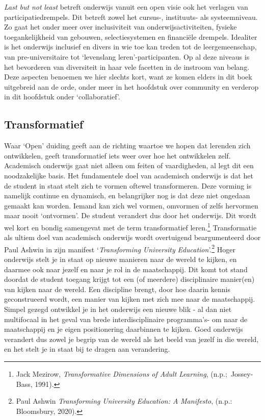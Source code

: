 \documentclass[smallauthor, chapterhaspagenum, nochapterinheader, pagenuminheader,  bigchapnum,medium2, tocpages,  garamond, titleinheader]{jote-book}
\begin{document}
	\emph{Last but }\emph{not}\emph{ }\emph{least}\emph{ }betreft onderwijs vanuit een open visie ook het verlagen van participatiedrempels. Dit betreft zowel het cursus-, instituuts- als systeemniveau. Zo gaat het onder meer over inclusiviteit van onderwijsactiviteiten, fysieke toegankelijkheid van gebouwen, selectiesystemen en financiële drempels. Idealiter is het onderwijs inclusief en divers in wie toe kan treden tot de leergemeenschap, van pre-universitaire tot ‘levenslang leren'-participanten. Op al deze niveaus is het bevorderen van diversiteit in haar vele facetten in de instroom van belang. Deze aspecten benoemen we hier slechts kort, want ze komen elders in dit boek uitgebreid aan de orde, onder meer in het hoofdstuk over community en verderop in dit hoofdstuk onder ‘collaboratief'.



	\subsection{Transformatief}



	Waar ‘Open' duiding geeft aan de richting waartoe we hopen dat lerenden zich ontwikkelen, geeft transformatief iets weer over hoe het ontwikkelen zelf. Academisch onderwijs gaat niet alleen om feiten of vaardigheden, al legt dit een noodzakelijke basis. Het fundamentele doel van academisch onderwijs is dat het de student in staat stelt zich te vormen oftewel transformeren. Deze vorming is namelijk continue en dynamisch, en belangrijker nog is dat deze niet ongedaan gemaakt kan worden. Iemand kan zich wel vormen, omvormen of zelfs hervormen maar nooit ‘ontvormen'. De student verandert dus door het onderwijs. Dit wordt wel kort en bondig samengevat met de term transformatief leren.\footnote{Jack Mezirow, \emph{Transformative}\emph{ }\emph{Dimensions}\emph{ of Adult Lea}\emph{rn}\emph{ing}, (n.p.; Jossey-Bass, 1991).} Transformatie als ultiem doel van academisch onderwijs wordt overtuigend beargumenteerd door Paul Ashwin in zijn manifest ‘\emph{Transforming}\emph{ University }\emph{Education}'.\footnote{Paul Ashwin \emph{Transforming}\emph{ University }\emph{Education}\emph{: A}\emph{ }\emph{Manifesto}, (n.p.: Bloomsbury, 2020).} Hoger onderwijs stelt je in staat op nieuwe manieren naar de wereld te kijken, en daarmee ook naar jezelf en naar je rol in de maatschappij. Dit komt tot stand doordat de student toegang krijgt tot een (of meerdere) disciplinaire manier(en) van kijken naar de wereld. Een discipline brengt, door hoe daarin kennis geconstrueerd wordt, een manier van kijken met zich mee naar de maatschappij. Simpel gezegd ontwikkel je in het onderwijs een nieuwe blik - al dan niet multifocaal in het geval van brede interdisciplinaire programma's- om naar de maatschappij en je eigen positionering daarbinnen te kijken. Goed onderwijs verandert dus zowel je begrip van de wereld als het beeld van jezelf in die wereld, en het stelt je in staat bij te dragen aan verandering.
\end{document}
